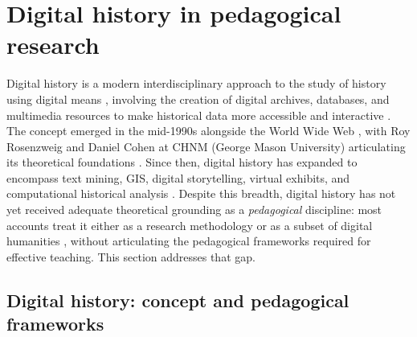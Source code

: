  \label{ch:theory}

\section{Digital history in pedagogical research} \label{sec:dh-review}

Digital history is a modern interdisciplinary approach to the study of history using digital means \cite{ROMEIN, guiliano, Milligan}, involving the creation of digital archives, databases, and multimedia resources to make historical data more accessible and interactive \citep{CohenRosenzweig2006}. The concept emerged in the mid-1990s alongside the World Wide Web \cite{SeefeldtClark2009, NCPH2016}, with Roy Rosenzweig and Daniel Cohen at CHNM (George Mason University) articulating its theoretical foundations \cite{CohenRosenzweig2006}. Since then, digital history has expanded to encompass text mining, GIS, digital storytelling, virtual exhibits, and computational historical analysis \cite{Crymble2021, Graham20151, Bordalejo2025, Lucchesi2019}. Despite this breadth, digital history has not yet received adequate theoretical grounding as a \textit{pedagogical} discipline: most accounts treat it either as a research methodology \cite{Graham20151, Crymble2021} or as a subset of digital humanities \cite{Berry2012, Moretti2013}, without articulating the pedagogical frameworks required for effective teaching. This section addresses that gap.

\subsection{Digital history: concept and pedagogical frameworks} \label{subsec:dh-concept}

